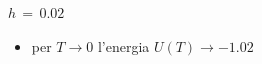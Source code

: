 \begin{frame}
\begin{columns}
\begin{column}{0.5\textwidth}
\begin{block}{$h\,=\,0.02$}
                \vspace{0.5cm}
                \begin{itemize}[itemsep=0.5em, label=$\diamond$]
                    \item per $T \to 0$ l'energia $U\left(T\right) \to -1.02$
                \end{itemize}
            
            \end{block}
        \end{column}
    \end{columns}

\end{frame}